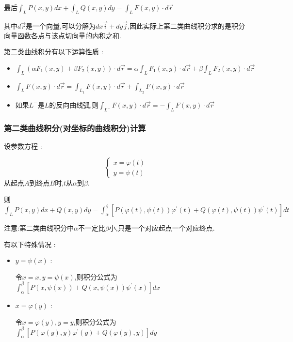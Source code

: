 \documentclass[UTF8,12pt]{ctexbook}
\newcommand{\derivative}{^\prime}
\newcommand{\definiteIntegral}[2]{\int^{#1}_{#2}}
\newcommand{\pathIntegral}[1]{\int_{#1}}
\begin{document}
{{{{    最后$\pathIntegral{L}P(x,y)dx + \pathIntegral{L}Q(x,y)dy = \pathIntegral{L}F(x,y) \cdot d\vec{r}$

    其中$d\vec{r}$是一个向量,可以分解为$dx\vec{i} + dy\vec{j}$,因此实际上第二类曲线积分求的是积分向量函数各点与该点切向量的内积之和.

    第二类曲线积分有以下运算性质 :
    \begin{itemize}
      \item $\pathIntegral{L}(\alpha F_1(x,y) + \beta F_2(x,y)) \cdot d\vec{r} = \alpha\pathIntegral{L}F_1(x,y) \cdot d\vec{r} + \beta\pathIntegral{L}F_2(x,y) \cdot d\vec{r}$
      \item $\pathIntegral{L}F(x,y) \cdot d\vec{r} = \pathIntegral{L_1}F(x,y) \cdot d\vec{r} + \pathIntegral{L_2}F(x,y) \cdot d\vec{r}$
      \item 如果$L^-$是$L$的反向曲线弧,则$\pathIntegral{L^-}F(x,y) \cdot d\vec{r} = -\pathIntegral{L}F(x,y) \cdot d\vec{r}$
    \end{itemize}
    }%

    \subsubsection{第二类曲线积分(对坐标的曲线积分)计算}{
      设参数方程 :
      \begin{center}
        $$
          \begin{cases}
            x = \varphi(t) \\
            y = \psi(t)
          \end{cases}
        $$
        从起点$A$到终点$B$时,$t$从$\alpha$到$\beta$.
      \end{center}
      则$\pathIntegral{L}P(x,y)dx + Q(x,y)dy = \definiteIntegral{\beta}{\alpha}[P(\varphi(t),\psi(t))\varphi\derivative(t) + Q(\varphi(t),\psi(t))\psi\derivative(t)]dt$

      注意:第二类曲线积分中$\alpha$不一定比$\beta$小,只是一个对应起点一个对应终点.

      有以下特殊情况 :
      \begin{itemize}
        \item {
              $y = \psi(x)$ :

              令$x = x,y = \psi(x)$,则积分公式为$\definiteIntegral{\beta}{\alpha}[P(x,\psi(x)) + Q(x,\psi(x))\psi\derivative(x)]dx$
              }
        \item{
              $x = \varphi(y)$ :

              令$x = \varphi(y),y = y$,则积分公式为$\definiteIntegral{\beta}{\alpha}[P(\varphi(y),y)\varphi\derivative(y) + Q(\varphi(y),y)]dy$
              }
      \end{itemize}
    }%

}}}
\end{document}
